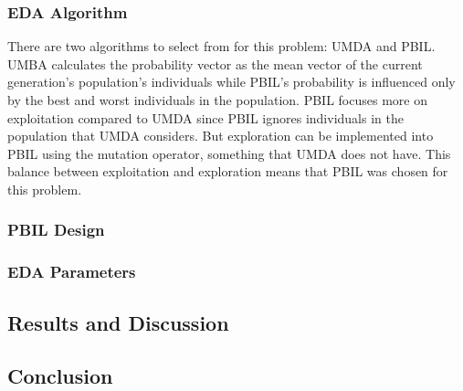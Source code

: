 \documentclass{article}
\begin{document}
\subsubsection*{EDA Algorithm}
There are two algorithms to select from for this problem: UMDA and PBIL. UMBA calculates the probability vector as the mean vector of the current generation’s population’s individuals while PBIL's probability is influenced only by the best and worst individuals in the population. PBIL focuses more on exploitation compared to UMDA since PBIL ignores individuals in the population that UMDA considers. But exploration can be implemented into PBIL using the mutation operator, something that UMDA does not have. This balance between exploitation and exploration means that PBIL was chosen for this problem. \par
\subsubsection*{PBIL Design}
\subsubsection*{EDA Parameters}
\cite{baluja1994population}
\subsection*{Results and Discussion}
\subsection*{Conclusion}



\end{document}
